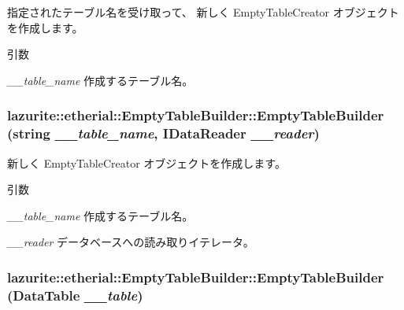 指定されたテーブル名を受け取って、 新しく EmptyTableCreator オブジェクトを作成します。 
\begin{DoxyParams}{引数}
\item[{\em \_\-\_\-table\_\-name}]作成するテーブル名。\end{DoxyParams}
\hypertarget{classlazurite_1_1etherial_1_1_empty_table_builder_a02be64055747f1e2318c379d72987ea3}{
\subsubsection[{EmptyTableBuilder}]{\setlength{\rightskip}{0pt plus 5cm}lazurite::etherial::EmptyTableBuilder::EmptyTableBuilder (string {\em \_\-\_\-table\_\-name}, \/  IDataReader {\em \_\-\_\-reader})}}
\label{classlazurite_1_1etherial_1_1_empty_table_builder_a02be64055747f1e2318c379d72987ea3}


新しく EmptyTableCreator オブジェクトを作成します。 
\begin{DoxyParams}{引数}
\item[{\em \_\-\_\-table\_\-name}]作成するテーブル名。\item[{\em \_\-\_\-reader}]データベースへの読み取りイテレータ。\end{DoxyParams}
\hypertarget{classlazurite_1_1etherial_1_1_empty_table_builder_ab0d2d265dd8d6508b5421865955211d5}{
\subsubsection[{EmptyTableBuilder}]{\setlength{\rightskip}{0pt plus 5cm}lazurite::etherial::EmptyTableBuilder::EmptyTableBuilder (DataTable {\em \_\-\_\-table})}}
\label{classlazurite_1_1etherial_1_1_empty_table_builder_ab0d2d265dd8d6508b5421865955211d5}

